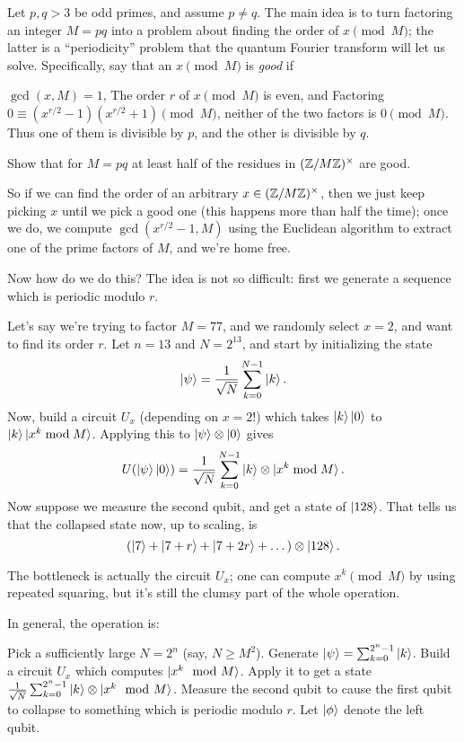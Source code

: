 Let $p,q > 3$ be odd primes, and assume $p \neq q$.
The main idea is to turn factoring an integer $M = pq$ into a problem
about finding the order of $x \pmod M$; the latter is a ``periodicity''
problem that the quantum Fourier transform will let us solve.
Specifically, say that an $x \pmod M$ is \emph{good} if
\begin{enumerate}[(i)]
	\ii $\gcd(x,M) = 1$,
	\ii The order $r$ of $x \pmod M$ is even, and
	\ii Factoring $0 \equiv (x^{r/2}-1)(x^{r/2}+1) \pmod M$,
	neither of the two factors is $0 \pmod M$.
	Thus one of them is divisible by $p$, and the other
	is divisible by $q$.
\end{enumerate}
\begin{exercise}
	Show that for $M = pq$ at least half of the residues
	in $(\mathbb Z/M\mathbb Z)^\times$ are good.
\end{exercise}

So if we can find the order of an arbitrary $x \in (\mathbb Z/M\mathbb Z)^\times$,
then we just keep picking $x$ until we pick a good one
(this happens more than half the time);
once we do, we compute $\gcd(x^{r/2}-1,M)$ using the Euclidean
algorithm to extract one of the prime factors of $M$, and we're home free.

Now how do we do this?  The idea is not so difficult:
first we generate a sequence which is periodic modulo $r$.
\begin{example}
	Let's say we're trying to factor $M = 77$,
	and we randomly select $x = 2$, and want to find its order $r$.
	Let $n = 13$ and $N = 2^{13}$, and start by initializing the state
	\[ \ket\psi = \frac{1}{\sqrt N} \sum_{k=0}^{N-1} \ket k. \]
	Now, build a circuit $U_x$ (depending on $x=2$!)
	which takes $\ket k \ket 0$ to $\ket k \ket{x^k \bmod M}$.
	Applying this to $\ket\psi \otimes \ket0$ gives
	\[ U(\ket\psi\ket0) =
		\frac{1}{\sqrt N} \sum_{k=0}^{N-1} \ket k \otimes \ket{x^k \bmod M}. \]
	Now suppose we measure the second qubit, and get a state of $\ket{128}$.
	That tells us that the collapsed state now, up to scaling, is
	\[ (\ket{7} + \ket{7+r} + \ket{7+2r} + \dots) \otimes \ket{128}. \]
\end{example}
The bottleneck is actually the circuit $U_x$;
one can compute $x^k \pmod M$ by using repeated squaring,
but it's still the clumsy part of the whole operation.

In general, the operation is:
\begin{itemize}
	\ii Pick a sufficiently large $N = 2^n$ (say, $N \ge M^2$).
	\ii Generate $\ket\psi = \sum_{k=0}^{2^n-1} \ket{k}$.
	\ii Build a circuit $U_x$ which computes $\ket{x^k \mod M}$.
	\ii Apply it to get a state
	$\frac{1}{\sqrt N} \sum_{k=0}^{2^n-1} \ket k \otimes \ket{x^k \mod M}$.
	\ii Measure the second qubit to cause the first qubit to
	collapse to something which is periodic modulo $r$.
	Let $\ket\phi$ denote the left qubit.
\end{itemize}

